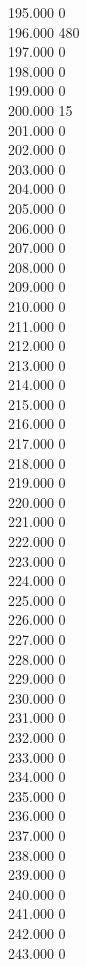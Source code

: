 { 195.000	0 \\
 196.000	480 \\
 197.000	0 \\
 198.000	0 \\
 199.000	0 \\
 200.000	15 \\
 201.000	0 \\
 202.000	0 \\
 203.000	0 \\
 204.000	0 \\
 205.000	0 \\
 206.000	0 \\
 207.000	0 \\
 208.000	0 \\
 209.000	0 \\
 210.000	0 \\
 211.000	0 \\
 212.000	0 \\
 213.000	0 \\
 214.000	0 \\
 215.000	0 \\
 216.000	0 \\
 217.000	0 \\
 218.000	0 \\
 219.000	0 \\
 220.000	0 \\
 221.000	0 \\
 222.000	0 \\
 223.000	0 \\
 224.000	0 \\
 225.000	0 \\
 226.000	0 \\
 227.000	0 \\
 228.000	0 \\
 229.000	0 \\
 230.000	0 \\
 231.000	0 \\
 232.000	0 \\
 233.000	0 \\
 234.000	0 \\
 235.000	0 \\
 236.000	0 \\
 237.000	0 \\
 238.000	0 \\
 239.000	0 \\
 240.000	0 \\
 241.000	0 \\
 242.000	0 \\
 243.000	0 \\
}
